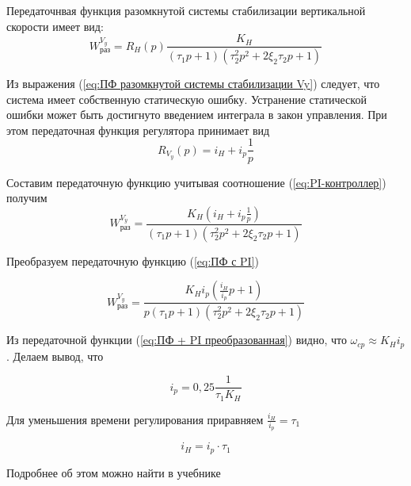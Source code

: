     Передаточнвая функция разомкнутой системы стабилизации вертикальной скорости имеет вид:
    \begin{equation}
    \label{eq:ПФ разомкнутой системы стабилизации Vy}
        W^{V_y}_\text{раз}=R_H(p)\frac{K_H}{(\tau_1p+1)(\tau_2^2p^2+2\xi_2\tau_2p+1)}
    \end{equation}
    
    Из выражения (\ref{eq:ПФ разомкнутой системы стабилизации Vy}) следует, что система имеет собственную статическую ошибку. Устранение статической ошибки может быть достигнуто введением интеграла в закон управления. При этом передаточная функция регулятора принимает вид
    \begin{equation}
        \label{eq:PI-контроллер}
        R_{V_y}(p) = i_H + i_p\frac{1}{p}
    \end{equation}
    
    
    Составим передаточную функцию учитывая соотношение (\ref{eq:PI-контроллер}) получим
    \begin{equation}
        \label{eq:ПФ с PI}
        W_\text{раз}^{V_{y}} = \frac{K_H (i_H+i_p\frac{1}{p})}{(\tau_1p+1)(\tau_2^2p^2+2\xi_2\tau_2p+1)}
    \end{equation}
    
    Преобразуем передаточную функцию (\ref{eq:ПФ с PI})
    
    \begin{equation}
        \label{eq:ПФ + PI преобразованная}
        W_\text{раз}^{V_y} = \frac{K_H i_p (\frac{i_H}{i_p}p + 1)}{p(\tau_1p+1)(\tau_2^2p^2+2\xi_2\tau_2p+1)}
    \end{equation}
    
    Из передаточной функции (\ref{eq:ПФ + PI преобразованная}) видно, что $\omega_{cp} \approx K_H i_p$. Делаем вывод, что 
    
    \begin{equation}
    \label{eq:i_p}
        i_p = 0,25 \frac{1}{\tau_1 K_H}
    \end{equation}
    
    Для уменьшения времени регулирования приравняем $\frac{i_H}{i_p} = \tau_1$
    
    \begin{equation}
        \label{eq:i_H}
        i_H = i_p \cdot \tau_1
    \end{equation}
    
    Подробнее об этом можно найти в учебнике \cite{UDLA}
    
